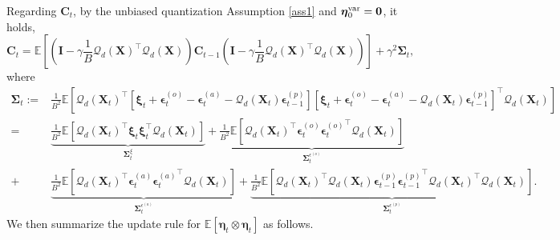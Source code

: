 \documentclass[11pt, letterpaper]{article}
\begin{document}
Regarding $\mathbf{C}_t$, by the unbiased quantization Assumption \ref{ass1} and $\boldsymbol{\eta}_0^{\rm var}=\boldsymbol{0}$, it holds,
\begin{equation}
    \label{eq: ct}
    \mathbf{C}_t=\mathbb{E}\left[\left(\mathbf{I}-\gamma\frac{1}{B} {\mathcal{Q}_d(\mathbf{X})}^\top \mathcal{Q}_d(\mathbf{X}) \right)\mathbf{C}_{t-1}\left(\mathbf{I}-\gamma\frac{1}{B} {\mathcal{Q}_d(\mathbf{X})}^\top \mathcal{Q}_d(\mathbf{X}) \right)\right]+\gamma^2 \boldsymbol{\Sigma}_t,
\end{equation}
where
    \begin{equation*}
        \begin{aligned}
            \boldsymbol{\Sigma}_t:=&\frac{1}{B^2}\mathbb{E}\left[{\mathcal{Q}_d(\mathbf{X}_t)}^\top\left[\boldsymbol{\xi}_t+\boldsymbol{\epsilon}_t^{(o)}-\boldsymbol{\epsilon}_t^{(a)}-\mathcal{Q}_d(\mathbf{X}_t)\boldsymbol{\epsilon}_{t-1}^{(p)}\right]\left[\boldsymbol{\xi}_t+\boldsymbol{\epsilon}_t^{(o)}-\boldsymbol{\epsilon}_t^{(a)}-\mathcal{Q}_d(\mathbf{X}_t)\boldsymbol{\epsilon}_{t-1}^{(p)}\right]^\top{\mathcal{Q}_d(\mathbf{X}_t)}\right]\\
            =&\underbrace{\frac{1}{B^2}\mathbb{E}\left[{\mathcal{Q}_d(\mathbf{X}_t)}^\top \boldsymbol{\xi}_t\boldsymbol{\xi}_t^\top \mathcal{Q}_d(\mathbf{X}_t)\right]}_{\boldsymbol{\Sigma}_t^\xi}+\underbrace{\frac{1}{B^2}\mathbb{E}\left[{\mathcal{Q}_d(\mathbf{X}_t)}^\top \boldsymbol{\epsilon}_t^{(o)}{\boldsymbol{\epsilon}_t^{(o)}}^\top \mathcal{Q}_d(\mathbf{X}_t)\right]}_{\boldsymbol{\Sigma}_t^{\epsilon^{(o)}}}\\
            +&\underbrace{\frac{1}{B^2}\mathbb{E}\left[{\mathcal{Q}_d(\mathbf{X}_t)}^\top \boldsymbol{\epsilon}_t^{(a)}{\boldsymbol{\epsilon}_t^{(a)}}^\top \mathcal{Q}_d(\mathbf{X}_t)\right]}_{\boldsymbol{\Sigma}_t^{\epsilon^{(a)}}}+\underbrace{\frac{1}{B^2}\mathbb{E}\left[{\mathcal{Q}_d(\mathbf{X}_t)}^\top {\mathcal{Q}_d(\mathbf{X}_t)}\boldsymbol{\epsilon}_{t-1}^{(p)}{\boldsymbol{\epsilon}_{t-1}^{(p)}}^\top {\mathcal{Q}_d(\mathbf{X}_t)}^\top\mathcal{Q}_d(\mathbf{X}_t)\right]}_{\boldsymbol{\Sigma}_t^{\epsilon^{(p)}}}.
        \end{aligned}
    \end{equation*}
    We then summarize the update rule for $\mathbb{E}\left[\boldsymbol{\eta}_t\otimes\boldsymbol{\eta}_t \right]$ as follows.
\end{document}

